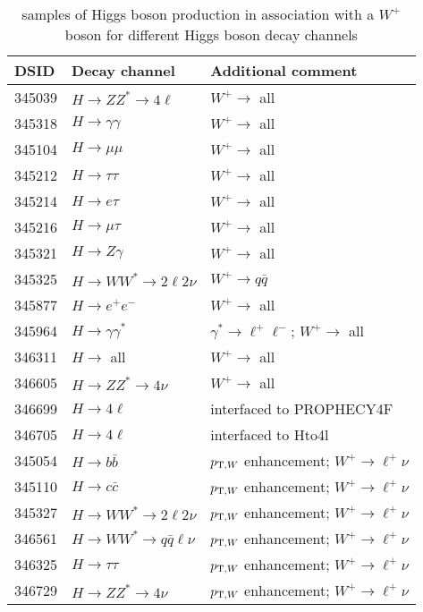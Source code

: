 \begin{table}[!htbp]
\begin{center}
\caption{ \POWPY[8] samples of Higgs boson production in association with a $W^{+}$ boson for different Higgs boson decay channels} 
\begin{tabular}{ l | l | l}
\hline
DSID   & Decay channel & Additional comment \\
\hline
345039 & $H\to ZZ^{*} \to 4\ell$ & $W^{+}\to$ all\\
345318 & $H\to \gamma\gamma$ & $W^{+}\to$ all\\
345104 & $H\to \mu\mu$ &  $W^{+}\to$ all\\
345212 & $H\to \tau\tau$ &  $W^{+}\to$ all\\
345214 & $H\to e \tau $ & $W^{+}\to$ all\\
345216 & $H\to \mu \tau $ & $W^{+}\to$ all\\
345321 & $H\to Z\gamma$ & $W^{+}\to$ all\\
345325 & $H\to WW^{*} \to 2\ell2\nu $ & $W^{+} \to q\bar{q}$ \\
345877 & $H\to e^{+}e^{-}$ & $W^{+}\to$ all\\
345964 & $H\to \gamma\gamma^{*}$ & $\gamma^{*}\to \ell^{+}\ell^{-}$; $W^{+}\to$ all\\
346311 & $H\to$ all & $W^{+}\to$ all\\ 
346605 & $H\to ZZ^{*} \to 4\nu $ & $W^{+}\to$ all\\
346699 & $H \to 4\ell$ & interfaced to PROPHECY4F \\
346705 & $H \to 4\ell$ & interfaced to Hto4l \\
345054 & $H\to b\bar{b}$ & $p_{{\textrm T},W}$ enhancement; $W^{+}\to \ell^{+}\nu$ \\
345110 & $H\to c\bar{c}$ & $p_{{\textrm T},W}$ enhancement; $W^{+}\to \ell^{+}\nu$ \\
345327 & $H\to WW^{*} \to 2\ell2\nu$ & $p_{{\textrm T},W}$ enhancement; $W^{+}\to \ell^{+}\nu$ \\ 
346561 & $H\to WW^{*} \to q\bar{q}\ell\nu$ & $p_{{\textrm T},W}$ enhancement; $W^{+}\to \ell^{+}\nu$ \\
346325 & $H\to \tau\tau$ & $p_{{\textrm T},W}$ enhancement; $W^{+}\to \ell^{+}\nu$ \\
346729 & $H\to ZZ^{*} \to 4\nu$ & $p_{{\textrm T},W}$ enhancement; $W^{+}\to \ell^{+}\nu$ \\
\hline
\end{tabular}
\end{center}
\end{table}

